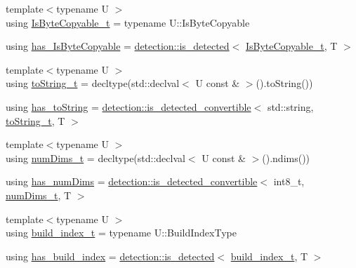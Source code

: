 \begin{DoxyCompactItemize}
{\footnotesize template$<$typename U $>$ }\\using \hyperlink{structvt_1_1index_1_1_index_traits_a6869472628098b68d1ce678422814734}{Is\+Byte\+Copyable\+\_\+t} = typename U\+::\+Is\+Byte\+Copyable
\item 
using \hyperlink{structvt_1_1index_1_1_index_traits_ab35645966fbb207e0e70982a610f1eb2}{has\+\_\+\+Is\+Byte\+Copyable} = \hyperlink{namespacedetection_a30893549a3de1e9603d78dad6d5dce92}{detection\+::is\+\_\+detected}$<$ \hyperlink{structvt_1_1index_1_1_index_traits_a6869472628098b68d1ce678422814734}{Is\+Byte\+Copyable\+\_\+t}, T $>$
\item 
{\footnotesize template$<$typename U $>$ }\\using \hyperlink{structvt_1_1index_1_1_index_traits_afd3d724feb07329acc70afc067320558}{to\+String\+\_\+t} = decltype(std\+::declval$<$ U const  \& $>$().to\+String())
\item 
using \hyperlink{structvt_1_1index_1_1_index_traits_ae91e2c26896622d9eab9416b4141042f}{has\+\_\+to\+String} = \hyperlink{namespacedetection_afb970b23e39cfecb33449d40242c49ff}{detection\+::is\+\_\+detected\+\_\+convertible}$<$ std\+::string, \hyperlink{structvt_1_1index_1_1_index_traits_afd3d724feb07329acc70afc067320558}{to\+String\+\_\+t}, T $>$
\item 
{\footnotesize template$<$typename U $>$ }\\using \hyperlink{structvt_1_1index_1_1_index_traits_a9c055598424a66789ec9a5986c2ace3a}{num\+Dims\+\_\+t} = decltype(std\+::declval$<$ U const  \& $>$().ndims())
\item 
using \hyperlink{structvt_1_1index_1_1_index_traits_aa063bfa4f5eec4fea36c7ee151519ceb}{has\+\_\+num\+Dims} = \hyperlink{namespacedetection_afb970b23e39cfecb33449d40242c49ff}{detection\+::is\+\_\+detected\+\_\+convertible}$<$ int8\+\_\+t, \hyperlink{structvt_1_1index_1_1_index_traits_a9c055598424a66789ec9a5986c2ace3a}{num\+Dims\+\_\+t}, T $>$
\item 
{\footnotesize template$<$typename U $>$ }\\using \hyperlink{structvt_1_1index_1_1_index_traits_a8a367bc83d2a3bd52bd5007efd6ff110}{build\+\_\+index\+\_\+t} = typename U\+::\+Build\+Index\+Type
\item 
using \hyperlink{structvt_1_1index_1_1_index_traits_a9507b2186fbda410df0f7c685504e314}{has\+\_\+build\+\_\+index} = \hyperlink{namespacedetection_a30893549a3de1e9603d78dad6d5dce92}{detection\+::is\+\_\+detected}$<$ \hyperlink{structvt_1_1index_1_1_index_traits_a8a367bc83d2a3bd52bd5007efd6ff110}{build\+\_\+index\+\_\+t}, T $>$
\end{DoxyCompactItemize}
